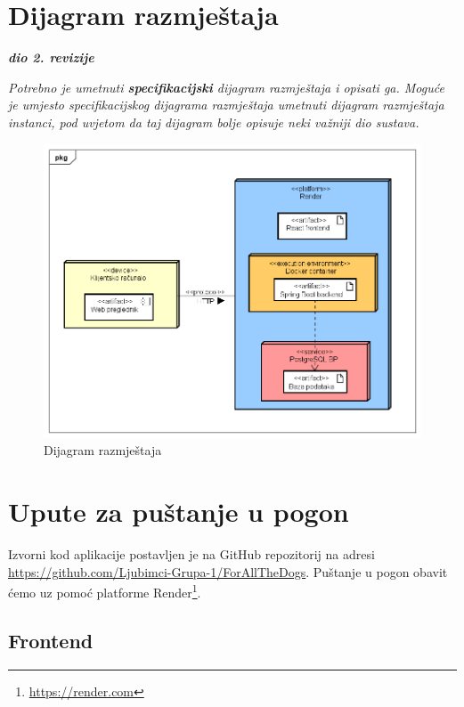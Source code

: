 			\eject 
		
		
		\section{Dijagram razmještaja}
			
			\textbf{\textit{dio 2. revizije}}
			
			 \textit{Potrebno je umetnuti \textbf{specifikacijski} dijagram razmještaja i opisati ga. Moguće je umjesto specifikacijskog dijagrama razmještaja umetnuti dijagram razmještaja instanci, pod uvjetom da taj dijagram bolje opisuje neki važniji dio sustava.}
			 
			 \begin{figure}[H]
				\includegraphics[scale=0.6]{slike/dijagram_razmjestaja.PNG} 
				\centering
				\caption{Dijagram razmještaja}
				\label{dijagram_razmjestaja}
			\end{figure}
			
			\eject 
		
		\section{Upute za puštanje u pogon}
		
			Izvorni kod aplikacije postavljen je na GitHub repozitorij na adresi \url{https://github.com/Ljubimci-Grupa-1/ForAllTheDogs}. Puštanje u pogon obavit ćemo uz pomoć platforme Render\footnote{\url{https://render.com}}.
			
			\subsection{Frontend}
			
